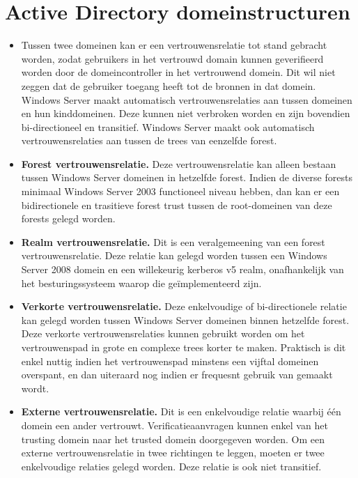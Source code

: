 \documentclass{report}
\begin{document}
	\section{Active Directory domeinstructuren }
	\begin{enumerate}
		 {
			\begin{itemize}
				\item Tussen twee domeinen kan er een vertrouwensrelatie tot stand gebracht worden, zodat gebruikers in het vertrouwd domain kunnen geverifieerd worden door de domeincontroller in het vertrouwend domein. Dit wil niet zeggen dat de gebruiker toegang heeft tot de bronnen in dat domein. Windows Server maakt automatisch vertrouwensrelaties aan tussen domeinen en hun kinddomeinen. Deze kunnen niet verbroken worden en zijn bovendien bi-directioneel en transitief. Windows Server maakt ook automatisch vertrouwensrelaties aan tussen de trees van eenzelfde forest.
			\end{itemize}
		}
		
		 { 
			\begin{itemize}
				\item \textbf{Forest vertrouwensrelatie.} Deze vertrouwensrelatie kan alleen bestaan tussen Windows Server domeinen in hetzelfde forest. Indien de diverse forests minimaal Windows Server 2003 functioneel niveau hebben, dan kan er een bidirectionele en trasitieve forest trust tussen de root-domeinen van deze forests gelegd worden. 
				\item \textbf{Realm vertrouwensrelatie.} Dit is een veralgemeening van een forest vertrouwensrelatie. Deze relatie kan gelegd worden tussen een Windows Server 2008 domein en een willekeurig kerberos v5 realm, onafhankelijk van het besturingssysteem waarop die geïmplementeerd zijn. 
				\item \textbf{Verkorte vertrouwensrelatie.} Deze enkelvoudige of bi-directionele relatie kan gelegd worden tussen Windows Server domeinen binnen hetzelfde forest. Deze verkorte vertrouwensrelaties kunnen gebruikt worden om het vertrouwenspad in grote en complexe trees korter te maken. Praktisch is dit enkel nuttig indien het vertrouwenspad minstens een vijftal domeinen overspant, en dan uiteraard nog indien er frequesnt gebruik van gemaakt wordt. 
				\item \textbf{Externe vertrouwensrelatie.} Dit is een enkelvoudige relatie waarbij één domein een ander vertrouwt. Verificatieaanvragen kunnen enkel van het trusting domein naar het trusted domein doorgegeven worden. Om een externe vertrouwensrelatie in twee richtingen te leggen, moeten er twee enkelvoudige relaties gelegd worden. Deze relatie is ook niet transitief.
			\end{itemize}

}
\end{enumerate}
\end{document}
